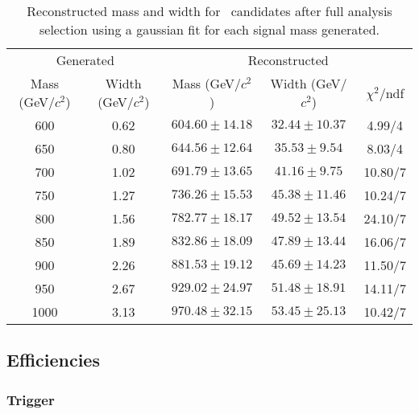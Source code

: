 \begin{table*}[htbH]
\begin{center}
\begin{tabular}{|c|c|c|c|c|}
\hline 
\multicolumn{2}{|c}{Generated} & \multicolumn{3}{|c|}{Reconstructed} \\
Mass (GeV/$c^{2}$) & Width (GeV/$c^{2}$) & Mass (GeV/$c^{2}$) & Width (GeV/$c^{2}$) & $\chi^{2} /$ndf\\
\hline
600 & 0.62 &$604.60\pm14.18$ & $32.44\pm10.37$ & 4.99/4\\
650 & 0.80 &$644.56\pm12.64$ & $35.53\pm9.54$ & 8.03/4\\
700 & 1.02 &$691.79\pm13.65$ & $41.16\pm9.75$ & 10.80/7\\
750 & 1.27 &$736.26\pm15.53$ & $45.38\pm11.46$ & 10.24/7\\
800 & 1.56 &$782.77\pm18.17$ & $49.52\pm13.54$ & 24.10/7\\
850 & 1.89 &$832.86\pm18.09$ & $47.89\pm13.44$ & 16.06/7\\
900 & 2.26 &$881.53\pm19.12$ & $45.69\pm14.23$ & 11.50/7\\
950 & 2.67 &$929.02\pm24.97$ & $51.48\pm18.91$ & 14.11/7\\
1000 & 3.13 &$970.48\pm32.15$ & $53.45\pm25.13$ & 10.42/7\\
\hline
\end{tabular}
\caption{Reconstructed mass and width for \Tp~candidates after full analysis selection using a gaussian fit for each signal mass generated. \label{tab:SignalWidths}}
\end{center}
\end{table*}

\subsection{Efficiencies}
\label{sec:eff}

\subsubsection{Trigger}
\label{sec:trigger_ana}

